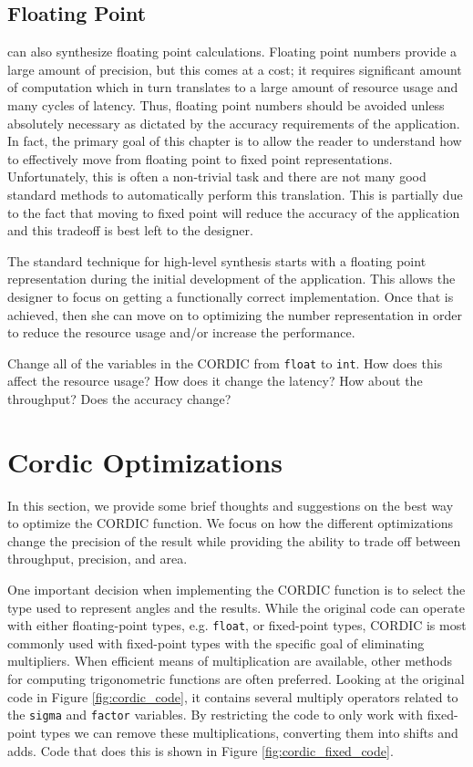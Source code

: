 \subsection{Floating Point}
\label{sec:floating_point}

\VHLS can also synthesize floating point calculations. Floating point numbers provide a large amount of precision, but this comes at a cost; it requires significant amount of computation which in turn translates to a large amount of resource usage and many cycles of latency. Thus, floating point numbers should be avoided unless absolutely necessary as dictated by the accuracy requirements of the application. In fact, the primary goal of this chapter is to allow the reader to understand how to effectively move from floating point to fixed point representations. Unfortunately, this is often a non-trivial task and there  are not many good standard methods to automatically perform this translation. This is partially due to the fact that moving to fixed point will reduce the accuracy of the application and this tradeoff is best left to the designer. 

The standard technique for high-level synthesis starts with a floating point representation during the initial development of the application. This allows the designer to focus on getting a functionally correct implementation. Once that is achieved, then she can move on to optimizing the number representation in order to reduce the resource usage and/or increase the performance. 

\begin{exercise}
Change all of the variables in the CORDIC from \lstinline{float} to \lstinline{int}. How does this affect the resource usage? How does it change the latency? How about the throughput? Does the accuracy change?
\end{exercise} 

\section{Cordic Optimizations}

In this section, we provide some brief thoughts and suggestions on the best way to optimize the CORDIC function. We focus on how the different optimizations change the precision of the result while providing the ability to trade off between throughput, precision, and area. 

One important decision when implementing the CORDIC function is to select the type used to represent angles and the results.  While the original code can operate with either floating-point types, e.g. \lstinline{float}, or fixed-point types, CORDIC is most commonly used with fixed-point types with the specific goal of eliminating multipliers.  When efficient means of multiplication are available, other methods for computing trigonometric functions are often preferred.   Looking at the original code in Figure \ref{fig:cordic_code}, it contains several multiply operators  related to the \lstinline{sigma} and \lstinline{factor} variables.  By restricting the code to only work with fixed-point types we can remove these multiplications, converting them into shifts and adds.  Code that does this is shown in Figure \ref{fig:cordic_fixed_code}.

